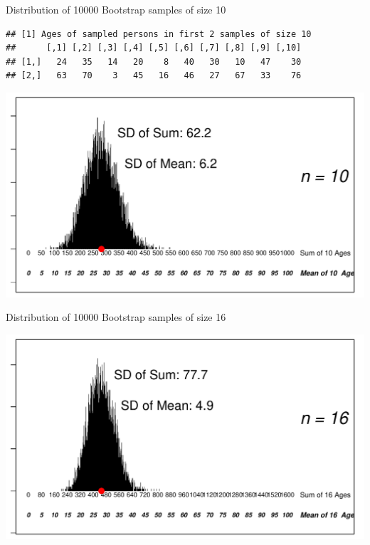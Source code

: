 \documentclass[10pt,handout]{beamer}\usepackage[]{graphicx}\usepackage[]{color}
\makeatletter
\def\maxwidth{ %
  \ifdim\Gin@nat@width>\linewidth
    \linewidth
  \else
    \Gin@nat@width
  \fi
}
\newenvironment{kframe}{%
 \def\at@end@of@kframe{}%
 \ifinner\ifhmode%
  \def\at@end@of@kframe{\end{minipage}}%
  \begin{minipage}{\columnwidth}%
 \fi\fi%
 \def\FrameCommand##1{\hskip\@totalleftmargin \hskip-\fboxsep
 \colorbox{shadecolor}{##1}\hskip-\fboxsep
     \hskip-\linewidth \hskip-\@totalleftmargin \hskip\columnwidth}%
 \MakeFramed {\advance\hsize-\width
   \@totalleftmargin\z@ \linewidth\hsize
   \@setminipage}}%
 {\par\unskip\endMakeFramed%
 \at@end@of@kframe}
\newenvironment{knitrout}{}{} %
\makeatother
\begin{document}
\begin{frame}[fragile]{Distribution of 10000 Bootstrap samples of size 10}
\begin{knitrout}\tiny
{}\color{fgcolor}\begin{kframe}
\begin{verbatim}
## [1] Ages of sampled persons in first 2 samples of size 10
##      [,1] [,2] [,3] [,4] [,5] [,6] [,7] [,8] [,9] [,10]
## [1,]   24   35   14   20    8   40   30   10   47    30
## [2,]   63   70    3   45   16   46   27   67   33    76
\end{verbatim}
\end{kframe}

{\centering \includegraphics[width=\maxwidth]{figure/unnamed-chunk-4-1} 

}


\end{knitrout}
	
\end{frame}




\begin{frame}[fragile]{Distribution of 10000 Bootstrap samples of size 16}
\begin{knitrout}\tiny
{}\color{fgcolor}

{\centering \includegraphics[width=\maxwidth]{figure/unnamed-chunk-5-1} 

}


\end{knitrout}
	
\end{frame}
\end{document}
